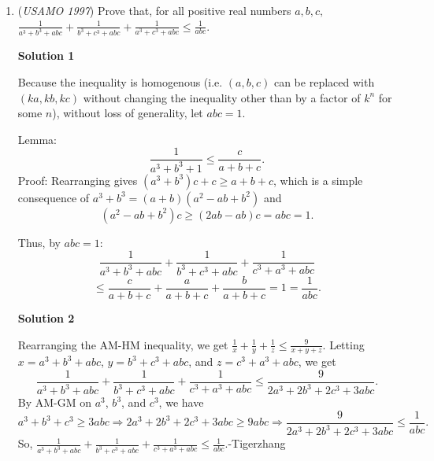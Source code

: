 \begin{enumerate}
$\textbf{Claim:}$  It is impossible to choose two non-adjacent sides and clip a whole part of it off.

 $\textbf{Proof:}$  If you clip adjacent sides, you can cut off at most up to the blue lines; Clipping more is impossible due to the degrees getting larger and larger and more and more circular.

 Thus, after infinitely many clips, the hexagon bounded by the blue lines is left, so after finitely many clips, the area left is more than that hexagon.

 The side length of that hexagon is $\frac{\sqrt{3}}{3}$ of the large one, because of 30-30-120 triangles. Thus, the area is $\frac13$ of the larger one, so we are done.

 


	\item (\textit{USAMO 1997}) Prove that, for all positive real numbers $a, b, c,$
$\frac{1}{a^3+b^3+abc}+\frac{1}{b^3+c^3+abc}+\frac{1}{a^3+c^3+abc} \le \frac{1}{abc}$.


 



\textbf{Solution 1}

Because the inequality is homogenous (i.e. $(a, b, c)$ can be replaced with $(ka, kb, kc)$ without changing the inequality other than by a factor of $k^n$ for some $n$), without loss of generality, let $abc = 1$.

 Lemma:
 \[\frac{1}{a^3 + b^3 + 1} \le \frac{c}{a + b + c}.\]Proof: Rearranging gives $(a^3 + b^3) c + c \ge a + b + c$, which is a simple consequence of $a^3 + b^3 = (a + b)(a^2 - ab + b^2)$ and
 \[(a^2 - ab + b^2)c \ge (2ab - ab)c = abc = 1.\]

 Thus, by $abc = 1$:
 \[\frac{1}{a^3 + b^3 + abc} + \frac{1}{b^3 + c^3 + abc} + \frac{1}{c^3 + a^3 + abc}\]
 \[\le \frac{c}{a + b + c} + \frac{a}{a + b + c} + \frac{b}{a + b + c} = 1 = \frac{1}{abc}.\]




\textbf{Solution 2}

Rearranging the AM-HM inequality, we get $\frac{1}{x}+\frac{1}{y}+\frac{1}{z} \le \frac{9}{x+y+z}$. Letting $x=a^{3}+b^{3}+abc$, $y=b^{3}+c^{3}+abc$, and $z=c^{3}+a^{3}+abc$, we get 
 \[\frac{1}{a^{3}+b^{3}+abc}+\frac{1}{b^{3}+c^{3}+abc}+\frac{1}{c^{3}+a^{3}+abc} \le \frac{9}{2a^{3}+2b^{3}+2c^{3}+3abc}.\] By AM-GM on $a^{3}$, $b^{3}$, and $c^{3}$, we have 
 \[a^{3}+b^{3}+c^{3} \ge 3abc \Rightarrow 2a^{3}+2b^{3}+2c^{3}+3abc \ge 9abc \Rightarrow \frac{9}{2a^{3}+2b^{3}+2c^{3}+3abc} \le \frac{1}{abc}.\] So, $\frac{1}{a^{3}+b^{3}+abc}+\frac{1}{b^{3}+c^{3}+abc}+\frac{1}{c^{3}+a^{3}+abc} \le \frac{1}{abc}$.-Tigerzhang


\end{enumerate}

